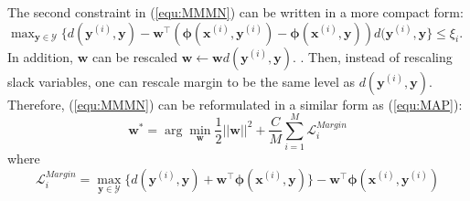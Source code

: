 The second constraint in (\ref{equ:MMMN}) can be written in a more compact form: 
$\max_{\mathbf{y}\in\mathcal{Y}} \{d(\mathbf{y}^{(i)},\mathbf{y})-{\mathbf{w}^\top} (\boldsymbol{\phi}(\mathbf{x}^{(i)},\mathbf{y}^{(i)})-\boldsymbol{\phi} 
        (\mathbf{x}^{(i)},\mathbf{y})) d(\mathbf{y}^{(i)},\mathbf{y}\}\leq \xi_i$. 
In addition, $\mathbf{w}$ can be rescaled $\mathbf{w}\gets \mathbf{w}d(\mathbf{y}^{(i)},\mathbf{y})$. 
. Then, instead of rescaling slack variables, one can rescale margin to be the same level as 
$d(\mathbf{y}^{(i)},\mathbf{y})$.  
Therefore, (\ref{equ:MMMN}) can be reformulated in a similar form as (\ref{equ:MAP}):
\begin{equation}
        \mathbf{w}^* = \arg\min_{\mathbf{w}} \frac{1}{2} ||\mathbf{w}||^2+ \frac{C}{M}\sum_{i=1}^M \mathcal{L}^{Margin}_i 
    \label{equ:MMMN_compact}
\end{equation}
where 
\begin{equation} 
    \mathcal{L}^{Margin}_i=\max_{\mathbf{y}\in\mathcal{Y}} \{d(\mathbf{y}^{(i)},\mathbf{y})+ \mathbf{w}^\top\boldsymbol{\phi} 
        (\mathbf{x}^{(i)},\mathbf{y})\} -\mathbf{w}^\top\boldsymbol{\phi}(\mathbf{x}^{(i)},\mathbf{y}^{(i)})
\label{equ:MMMN_loss}
\end{equation}



